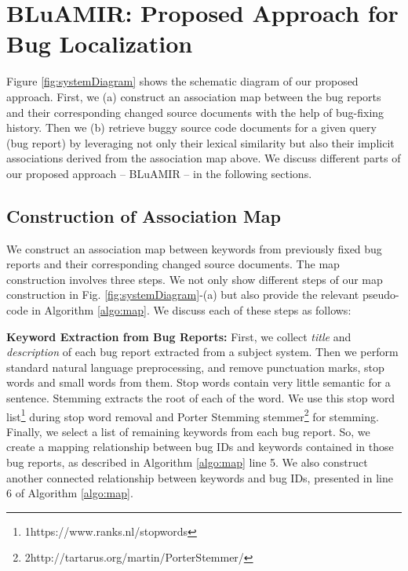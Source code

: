 \documentclass[conference]{IEEEtran}
\begin{document}
\section{BLuAMIR: Proposed Approach for Bug Localization} \label{sec:proposedmethod} 
Figure \ref{fig:systemDiagram} shows the schematic diagram of our proposed approach.
First, we (a) construct an association map between the bug reports and their corresponding changed source documents with the help of bug-fixing history.
Then we (b) retrieve buggy source code documents for a given query (bug report) by leveraging not only their lexical similarity but also their implicit associations derived from the association map above.   
We discuss different parts of our proposed approach -- BLuAMIR -- in the following sections.

\subsection{Construction of Association Map}\label{sec:MapConstruction}
We construct an association map between keywords from previously fixed bug reports and their corresponding changed source documents.
The map construction involves three steps.
We not only show different steps of our map construction in Fig. \ref{fig:systemDiagram}-(a) but also provide the relevant pseudo-code in  Algorithm \ref{algo:map}. We discuss each of these steps as follows:



\textbf{Keyword Extraction from Bug Reports:} First, we collect \emph{title} and \emph{description} of each bug report extracted from a subject system.  
Then we perform standard natural language preprocessing, and remove punctuation marks, stop words and small words from them. Stop words contain very little semantic for a sentence. Stemming extracts the root of each of the word. We use this stop word list\footnote{{1}https://www.ranks.nl/stopwords} during stop word removal and Porter Stemming stemmer\footnote{{2}http://tartarus.org/martin/PorterStemmer/} for stemming. Finally, we select a list of remaining keywords from each bug report. 
So, we create a mapping relationship between bug IDs and keywords contained in those bug reports, as described in Algorithm \ref{algo:map} line 5. We also construct another connected relationship between keywords and bug IDs, presented in
line 6 of Algorithm \ref{algo:map}.
\end{document}
